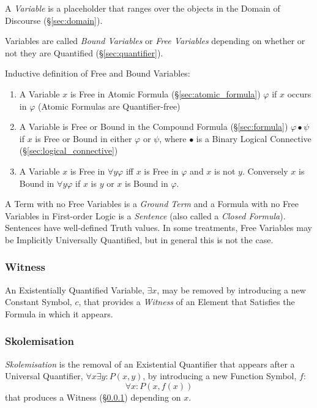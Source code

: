 A \emph{Variable} is a placeholder that ranges over the objects in the
Domain of Discourse (\S\ref{sec:domain}).

Variables are called \emph{Bound Variables} or \emph{Free Variables}
depending on whether or not they are Quantified
(\S\ref{sec:quantifier}).

Inductive definition of Free and Bound Variables:
\begin{enumerate}
\item A Variable $x$ is Free in Atomic Formula
  (\S\ref{sec:atomic_formula}) $\varphi$ if $x$ occurs in $\varphi$
  (Atomic Formulas are Quantifier-free)
\item A Variable is Free or Bound in the Compound Formula
  (\S\ref{sec:formula}) $\varphi \bullet \psi$ if $x$ is Free or Bound
  in either $\varphi$ or $\psi$, where $\bullet$ is a Binary Logical
  Connective (\S\ref{sec:logical_connective})
\item A Variable $x$ is Free in $\forall y \varphi$ iff $x$ is Free in
  $\varphi$ and $x$ is not $y$. Conversely $x$ is Bound in $\forall y
  \varphi$ if $x$ is $y$ or $x$ is Bound in $\varphi$.
\end{enumerate}

A Term with no Free Variables is a \emph{Ground Term} and a Formula
with no Free Variables in First-order Logic is a \emph{Sentence} (also
called a \emph{Closed Formula}). Sentences have well-defined Truth
values. In some treatments, Free Variables may be Implicitly
Universally Quantified, but in general this is not the case.



\subsubsection{Witness}\label{sec:witness}

An Existentially Quantified Variable, $\exists x$, may be removed by
introducing a new Constant Symbol, $c$, that provides a \emph{Witness}
of an Element that Satisfies the Formula in which it appears.



\subsubsection{Skolemisation}\label{sec:skolemisation}

\emph{Skolemisation} is the removal of an Existential Quantifier that
appears after a Universal Quantifier, $\forall x \exists y : P (x,y)$,
by introducing a new Function Symbol, $f$:
\[
  \forall x : P (x, f(x))
\]
that produces a Witness (\S\ref{sec:witness}) depending on $x$.



